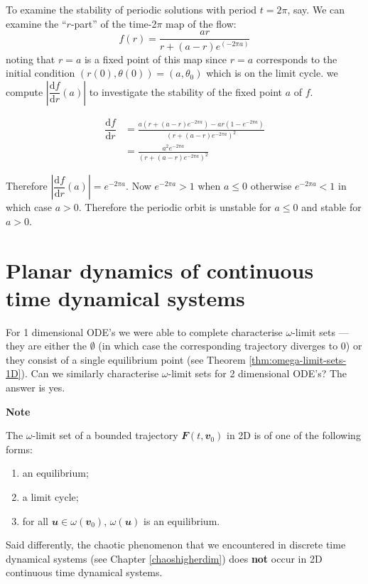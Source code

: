 \documentclass[
  a4paper,
  oneside,
  final]{krantz}
\providecommand{\tightlist}{%
  \setlength{\itemsep}{0pt}\setlength{\parskip}{0pt}}
\renewcommand{\d}{\mathrm{d}}
\renewcommand{\v}[1]{{\mathbfit{#1}}}
\newcommand{\der}[2]{\dfrac{\d #1}{\d #2}}
\theoremstyle{definition}
\theoremstyle{definition}
\theoremstyle{definition}
\theoremstyle{definition}
\theoremstyle{remark}
\begin{document}
To examine the stability of periodic solutions with period \(t = 2\pi\), say. We can examine the ``\(r\)-part'' of the time-2\(\pi\) map of the flow: \[f(r) = \frac{ ar}{ r + (a-r) e^{(-2\pi a)}}\] noting that \(r= a\) is a fixed point of this map since \(r=a\) corresponds to the initial condition \((r(0), \theta(0)) = (a, \theta_0)\) which is on the limit cycle. we compute \(\left| \der{f}{r}(a)\right|\) to investigate the stability of the fixed point \(a\) of \(f\).

\begin{align*}
\der{f}{r} &= \frac{a ( r + (a-r)e^{-2\pi a}) - ar(1- e^{-2\pi a})}{(r + (a-r)e^{-2\pi a})^2 } \\
           &= \frac{ a^2 e^{-2 \pi a} }{(r + (a-r)e^{-2\pi a})^2} 
\end{align*}

Therefore \(\left|\der{f}{r} (a) \right | = e^{-2\pi a}\). Now \(e^{-2\pi a} > 1\) when \(a \le 0\) otherwise \(e^{-2\pi a} <1\) in which case \(a >0\). Therefore the periodic orbit is unstable for \(a\le 0\) and stable for \(a>0\).

\hypertarget{planardynamics}{%
\section{Planar dynamics of continuous time dynamical systems}\label{planardynamics}}

For 1 dimensional ODE's we were able to complete characterise \(\omega\)-limit sets --- they are either the \(\emptyset\) (in which case the corresponding trajectory diverges to \(0\)) or they consist of a single equilibrium point (see Theorem \ref{thm:omega-limit-sets-1D}). Can we similarly characterise \(\omega\)-limit sets for 2 dimensional ODE's? The answer is yes.

\begin{palegreenbox}

\begin{center}
\textbf{Note}

\end{center}

The \(\omega\)-limit set of a bounded trajectory \(\v{F}(t, \v{v}_0)\) in 2D is of one of the following forms:

\begin{enumerate}
\def\labelenumi{\roman{enumi}.}
\tightlist
\item
  an equilibrium;
\item
  a limit cycle;
\item
  for all \(\v{u} \in \omega(\v{v}_{0})\), \(\omega(\v{u})\) is an equilibrium.
\end{enumerate}

Said differently, the chaotic phenomenon that we encountered in discrete time dynamical systems (see Chapter \ref{chaoshigherdim}) does \textbf{not} occur in 2D continuous time dynamical systems.

\end{palegreenbox}
\end{document}
